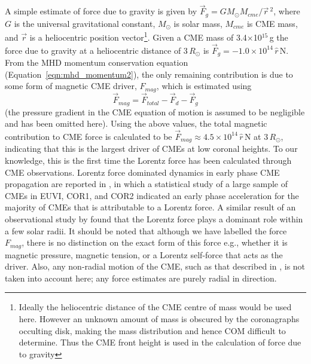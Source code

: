A simple estimate of force due to gravity is given by $\vec{F}_{g}=GM_{\odot}M_{cme}/\vec{r}\,^2$, where $G$ is the universal gravitational constant, $M_{\odot}$ is solar mass, $M_{cme}$ is CME mass, and $\vec{r}$ is a heliocentric position vector\footnote{Ideally the heliocentric distance of the CME centre of mass would be used here. However an unknown amount of mass is obscured by the coronagraphs occulting disk, making the mass distribution and hence COM difficult to determine. Thus the CME front height is used in the calculation of force due to gravity}. Given a CME mass of 3.4$\times$10$^{15}$\,g the force due to gravity at a heliocentric distance of 3\,$R_{\odot}$ is $\vec{F}_{g}=-1.0\times10^
{14}\,\hat{r}$\,N. From the MHD momentum conservation equation (Equation~\ref{eqn:mhd_momentum2}), the only remaining contribution is due to some form of magnetic CME driver, $F_{mag}$, which is estimated using 
\begin{equation}
\vec{F}_{mag}= \vec{F}_{total}-\vec{F}_{d}-\vec{F}_{g}
\end{equation}
(the pressure gradient in the CME equation of motion is assumed to be negligible and has been omitted here). Using the above values, the total magnetic contribution to CME force is calculated to be $\vec{F}_{mag}\approx4.5\times10^{14}\,\hat{r}$\,N at 3\,$R_{\odot}$, indicating that this is the largest driver of CMEs at low coronal heights. To our knowledge, this is the first time the Lorentz force has been calculated through CME observations. Lorentz force dominated dynamics in early phase CME propagation are reported in \citet{bein2011}, in which a statistical study of a large sample of CMEs in EUVI, COR1, and COR2 indicated an early phase acceleration for the majority of CMEs that is attributable to a Lorentz force.  A similar result of an observational study by \citet{vrs06} found that the Lorentz force plays a dominant role within a few solar radii. It should be noted that although we have labelled the force $F_{mag}$, there is no distinction on the exact form of this force e.g., whether it is magnetic pressure, magnetic tension, or a Lorentz self-force that acts as the driver. Also, any non-radial motion of the CME, such as that described in \citet{byrne2010}, is not taken into account here; any force estimates are purely radial in direction.


